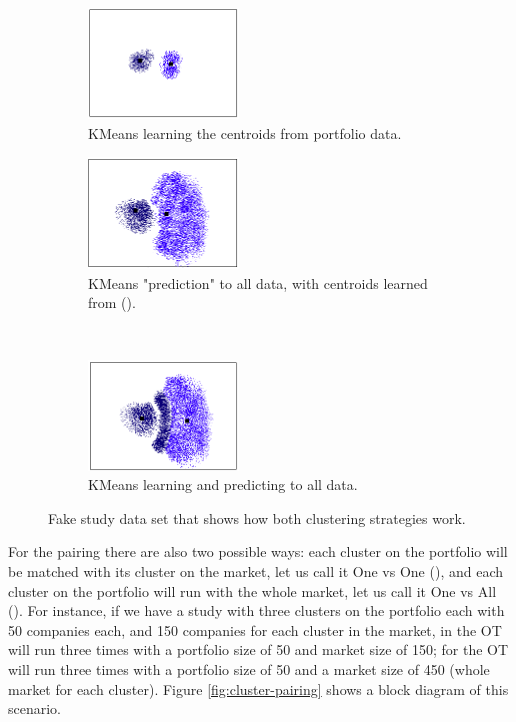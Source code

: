 \begin{figure}[!ht]
    \begin{subfigure}{.5\linewidth}
        \centering
        \includegraphics[width=4cm]{fig/ch3-cluster-strategy-port-fit.png}
        \caption{KMeans learning the centroids from portfolio data.}
        \label{fig:cluster-strategy:port-fit}
    \end{subfigure}
    \begin{subfigure}{.5\linewidth}
        \centering
        \includegraphics[width=4cm]{fig/ch3-cluster-strategy-port-predict.png}
        \caption{KMeans "prediction" to all data, with centroids learned from ().}
        \label{fig:cluster-strategy:port-predict}
    \end{subfigure}\\[1ex]
    \begin{subfigure}{\linewidth}
        \centering
        \includegraphics[width=4cm]{fig/ch3-cluster-strategy-all.png}
        \caption{KMeans learning and predicting to all data.}
        \label{fig:cluster-strategy:all}
    \end{subfigure}
    \caption{Fake study data set that shows how both clustering strategies work.}
    \label{fig:cluster-strategy}
\end{figure}

For the pairing there are also two possible ways: each cluster on the portfolio will be matched with its cluster on the market, let us call it One vs One (\nameClusterPairingA{}), and each cluster on the portfolio will run with the whole market, let us call it One vs All (\nameClusterPairingB{}). For instance, if we have a study with three clusters on the portfolio each with 50 companies each, and 150 companies for each cluster in the market, in \nameClusterPairingA{} the OT will run three times with a portfolio size of 50 and market size of 150; for \nameClusterPairingB{} the OT will run three times with a portfolio size of 50 and a market size of 450 (whole market for each cluster). Figure \ref{fig:cluster-pairing} shows a block diagram of this scenario.

